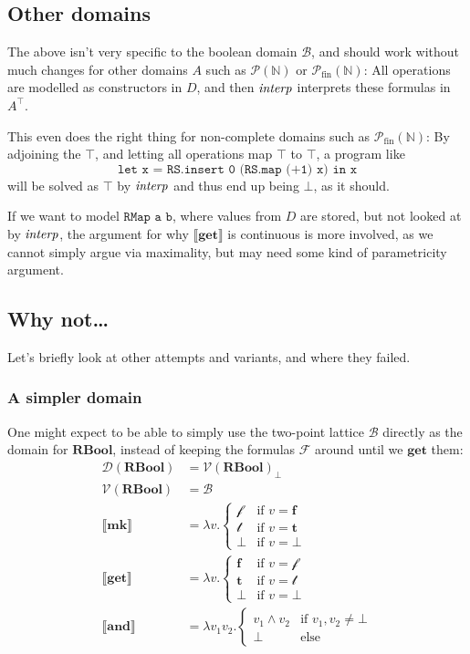 \documentclass[manuscript,screen,acmsmall,nonacm]{acmart}
\newcommand{\syntax}[1]{\mathbf{#1}}
\newcommand{\tRBool}{\syntax{RBool}}
\newcommand{\sMk}{\syntax{mk}}
\newcommand{\sGet}{\syntax{get}}
\newcommand{\sAnd}{\syntax{and}}
\newcommand{\dFalse}{\mathbf{f}}
\newcommand{\dTrue}{\mathbf{t}}
\newcommand{\rBool}{\mathscr B}
\newcommand{\rTrue}{\mathscr{t}}
\newcommand{\rFalse}{\mathscr{f}}
\newcommand{\dRBool}{\mathcal F}
\newcommand{\D}[1]{\llbracket #1 \rrbracket}
\newcommand{\tV}[1]{\mathcal V(#1)}
\newcommand{\tD}[1]{\mathcal D(#1)}
\begin{document}
\subsection{Other domains}

The above isn’t very specific to the boolean domain $\rBool$, and should work without much changes for other domains $A$ such as $\mathcal P(\mathbb N)$ or $\mathcal P_{\text{fin}}(\mathbb N)$: All operations are modelled as constructors in $D$, and then $\operatorname{\textit{interp}}$ interprets these formulas in $A^\top$.

This even does the right thing for non-complete domains such as $\mathcal P_{\text{fin}}(\mathbb N)$: By adjoining the $\top$, and letting all operations map $\top$ to $\top$, a program like
\[
\texttt{let x = RS.insert 0 (RS.map (+1) x) in x}
\]
will be solved as $\top$ by $\operatorname{\textit{interp}}$ and thus end up being $\bot$, as it should.

If we want to model $\texttt{RMap a b}$, where values from $D$ are stored, but not looked at by $\operatorname{\textit{interp}}$, the argument for why $\D{\sGet}$ is continuous is more involved, as we cannot simply argue via maximality, but may need some kind of parametricity argument.

\subsection{Why not\ldots}

Let's briefly look at other attempts and variants, and where they failed.

\subsubsection{A simpler domain}

One might expect to be able to simply use the two-point lattice $\rBool$ directly as the domain for $\tRBool$, instead of keeping the formulas $\dRBool$ around until we $\sGet$ them:
\begin{align*}
\tD\tRBool &= {\tV\tRBool}_\bot\\
\tV\tRBool &= \rBool\\
\D{\sMk} &= \lambda v. \begin{cases}
\rFalse & \text{if } v = \dFalse \\
\rTrue & \text{if } v = \dTrue \\
\bot  & \text{if } v = \bot
\end{cases}\\
\D{\sGet} &= \lambda v. \begin{cases}
\dFalse & \text{if } v = \rFalse \\
\dTrue & \text{if } v = \rTrue \\
\bot  & \text{if } v = \bot
\end{cases}\\
\D{\sAnd} &= \lambda v_1 v_2. \begin{cases}
v_1 \wedge v_2 & \text{if } v_1, v_2 \ne \bot \\
\bot & \text{else}
\end{cases}\\
\end{align*}
\end{document}
